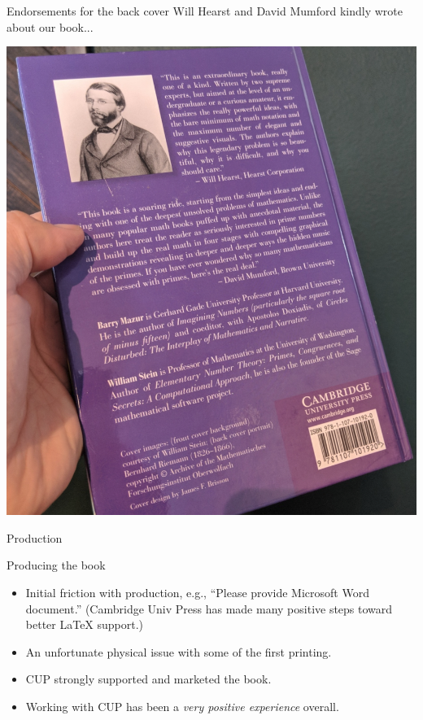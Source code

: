 \documentclass{beamer}
\begin{document}
\begin{frame}{Endorsements for the back cover}
  Will Hearst and David Mumford kindly wrote about our book...

  \begin{center}
    \includegraphics[height=.76\textheight]{pics/cover-back}
  \end{center}
\end{frame}

\begin{frame}{Production}
  \begin{block}{Producing the book}
    \begin{itemize}
      \item Initial friction with production, e.g., ``Please provide Microsoft Word document.'' (Cambridge Univ Press has made many positive steps toward better \LaTeX{} support.)
      \item An unfortunate physical issue with some of the first printing.
      \item CUP strongly supported and marketed the book.
      \item Working with CUP has been a {\em very positive experience} overall.
    \end{itemize}
  \end{block}
\end{frame}
\end{document}
